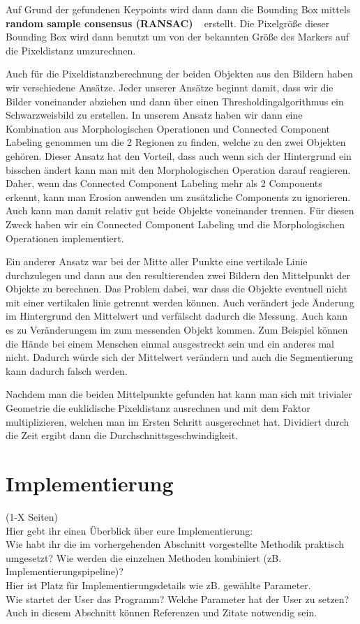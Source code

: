 \documentclass[deutsch]{scrartcl}
\begin{document}
Auf Grund der gefundenen Keypoints wird dann dann die Bounding Box mittels \textbf{random sample consensus (RANSAC)} ~\cite{fischler1981random} erstellt. Die Pixelgröße dieser Bounding Box wird dann benutzt um von der bekannten Größe des Markers auf die Pixeldistanz umzurechnen.

Auch für die Pixeldistanzberechnung der beiden Objekten aus den Bildern haben wir verschiedene Ansätze. Jeder unserer Ansätze beginnt damit, dass wir die Bilder voneinander abziehen und dann über einen Thresholdingalgorithmus ein Schwarzweisbild zu erstellen. In unserem Ansatz haben wir dann eine Kombination aus Morphologischen Operationen und Connected Component Labeling genommen um die 2 Regionen zu finden, welche zu den zwei Objekten gehören. Dieser Ansatz hat den Vorteil, dass auch wenn sich der Hintergrund ein bisschen ändert kann man mit den Morphologischen Operation darauf reagieren. Daher, wenn das Connected Component Labeling mehr als 2 Components erkennt, kann man Erosion anwenden um zusätzliche Components zu ignorieren. Auch kann man damit relativ gut beide Objekte voneinander trennen. Für diesen Zweck haben wir ein Connected Component Labeling und die Morphologischen Operationen implementiert.

Ein anderer Ansatz war bei der Mitte aller Punkte eine vertikale Linie durchzulegen und dann aus den resultierenden zwei Bildern den Mittelpunkt der Objekte zu berechnen. Das Problem dabei, war dass die Objekte eventuell nicht mit einer vertikalen linie getrennt werden können. Auch verändert jede Änderung im Hintergrund den Mittelwert und verfälscht dadurch die Messung. Auch kann es zu Veränderungem im zum messenden Objekt kommen. Zum Beispiel können die Hände bei einem Menschen einmal ausgestreckt sein und ein anderes mal nicht. Dadurch würde sich der Mittelwert verändern und auch die Segmentierung kann dadurch falsch werden.

Nachdem man die beiden Mittelpunkte gefunden hat kann man sich mit trivialer Geometrie die euklidische Pixeldistanz ausrechnen und mit dem Faktor multiplizieren, welchen man im Ersten Schritt ausgerechnet hat. Dividiert durch die Zeit ergibt dann die Durchschnittsgeschwindigkeit.


\section{Implementierung}
(1-X Seiten)\\
Hier gebt ihr einen Überblick über eure Implementierung:\\
Wie habt ihr die im vorhergehenden Abschnitt vorgestellte Methodik praktisch umgesetzt? Wie werden die einzelnen Methoden kombiniert (zB. Implementierungspipeline)?\\
Hier ist Platz für Implementierungsdetails wie zB. gewählte Parameter. \\
Wie startet der User das Programm? Welche Parameter hat der User zu setzen?\\
Auch in diesem Abschnitt können Referenzen und Zitate notwendig sein.\\
\end{document}
